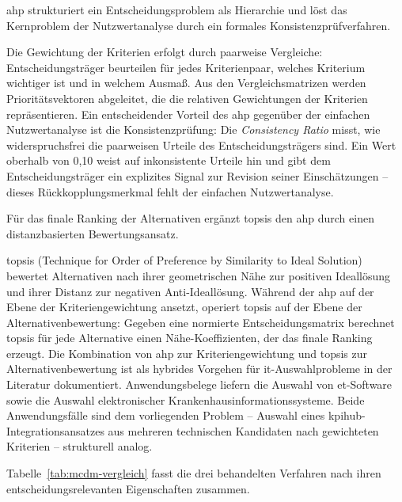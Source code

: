 \gls{ahp} strukturiert ein Entscheidungsproblem als Hierarchie und löst das Kernproblem der Nutzwertanalyse durch ein formales Konsistenzprüfverfahren.

Die Gewichtung der Kriterien erfolgt durch paarweise Vergleiche: Entscheidungsträger beurteilen für jedes Kriterienpaar, welches Kriterium wichtiger ist und in welchem Ausmaß.
Aus den Vergleichsmatrizen werden Prioritätsvektoren abgeleitet, die die relativen Gewichtungen der Kriterien repräsentieren.
Ein entscheidender Vorteil des \gls{ahp} gegenüber der einfachen Nutzwertanalyse ist die Konsistenzprüfung: Die \textit{Consistency Ratio} misst, wie widerspruchsfrei die paarweisen Urteile des Entscheidungsträgers sind.
Ein Wert oberhalb von 0,10 weist auf inkonsistente Urteile hin und gibt dem Entscheidungsträger ein explizites Signal zur Revision seiner Einschätzungen -- dieses Rückkopplungsmerkmal fehlt der einfachen Nutzwertanalyse.

Für das finale Ranking der Alternativen ergänzt \gls{topsis} den \gls{ahp} durch einen distanzbasierten Bewertungsansatz.

\gls{topsis} (Technique for Order of Preference by Similarity to Ideal Solution) bewertet Alternativen nach ihrer geometrischen Nähe zur positiven Ideallösung und ihrer Distanz zur negativen Anti-Ideallösung.
Während der \gls{ahp} auf der Ebene der Kriteriengewichtung ansetzt, operiert \gls{topsis} auf der Ebene der Alternativenbewertung: Gegeben eine normierte Entscheidungsmatrix berechnet \gls{topsis} für jede Alternative einen Nähe-Koeffizienten, der das finale Ranking erzeugt.
Die Kombination von \gls{ahp} zur Kriteriengewichtung und \gls{topsis} zur Alternativenbewertung ist als hybrides Vorgehen für \gls{it}-Auswahlprobleme in der Literatur dokumentiert.
Anwendungsbelege liefern die Auswahl von \gls{et}-Software sowie die Auswahl elektronischer Krankenhausinformationssysteme.
Beide Anwendungsfälle sind dem vorliegenden Problem -- Auswahl eines \gls{kpihub}-Integrationsansatzes aus mehreren technischen Kandidaten nach gewichteten Kriterien -- strukturell analog.

Tabelle~\ref{tab:mcdm-vergleich} fasst die drei behandelten Verfahren nach ihren entscheidungsrelevanten Eigenschaften zusammen.

